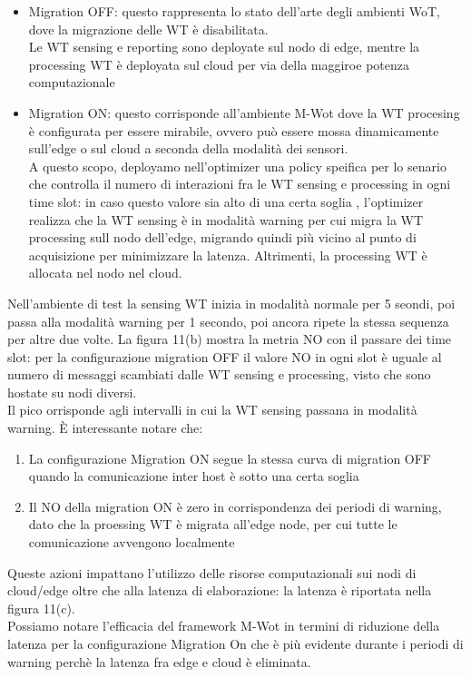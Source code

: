 \documentclass[11pt]{article}
\begin{document}
	\begin{itemize}
		\item Migration OFF: questo rappresenta lo stato dell'arte degli ambienti WoT, dove la migrazione delle WT è disabilitata. \\
		Le WT sensing e reporting sono deployate sul nodo di edge, mentre la processing WT è deployata sul cloud per via della maggiroe potenza computazionale
		\item Migration ON: questo corrisponde all'ambiente M-Wot dove la WT procesing è configurata per essere mirabile, ovvero può essere mossa dinamicamente sull'edge o sul cloud a seconda della modalità dei sensori. \\
		A questo scopo, deployamo nell'optimizer una policy speifica per lo senario che controlla il numero di interazioni fra le WT sensing e processing in ogni time slot: in caso questo valore sia alto di una certa soglia , l'optimizer realizza che la WT sensing è in modalità warning per cui migra la WT processing sull nodo dell'edge, migrando quindi più vicino al punto di acquisizione per minimizzare la latenza. Altrimenti, la processing WT è allocata nel nodo nel cloud.
	\end{itemize}

	Nell'ambiente di test la sensing WT inizia in modalità normale per 5 seondi, poi passa alla modalità warning per 1 secondo, poi ancora ripete la stessa sequenza per altre due volte.
	La figura 11(b) mostra la metria NO con il passare dei time slot: per la configurazione migration OFF il valore NO in ogni slot è uguale al numero di messaggi scambiati dalle WT sensing e processing, visto che sono hostate su nodi diversi. \\
	Il pico orrisponde agli intervalli in cui la WT sensing passana in modalità warning.
	È interessante notare che:
	\begin{enumerate}
		\item La configurazione Migration ON segue la stessa curva di migration OFF quando la comunicazione inter host è sotto una certa soglia
		\item Il NO della migration ON è zero in corrispondenza dei periodi di warning, dato che la proessing WT è migrata all'edge node, per cui tutte le comunicazione avvengono localmente
	\end{enumerate}
	Queste azioni impattano l'utilizzo delle risorse computazionali sui nodi di cloud/edge oltre che alla latenza di elaborazione: la latenza è riportata nella figura 11(c). \\
	Possiamo notare l'efficacia del framework M-Wot in termini di riduzione della latenza per la configurazione Migration On che è più evidente durante i periodi di warning perchè la latenza fra edge e cloud è eliminata.
	
\end{document}
